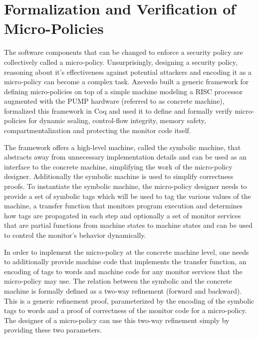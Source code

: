 \section{Formalization and Verification of Micro-Policies}\label{sec:micropolicies}

The software components that can be changed to enforce a security policy
are collectively called a micro-policy.
Unsurprisingly, designing a security policy, reasoning about it's effectiveness 
against potential attackers and encoding it as a micro-policy can become a 
complex task. Azevedo \ETAL \cite{pump_popl2015} built a generic framework for
defining micro-policies on top of a simple machine modeling a RISC processor 
augmented with the PUMP hardware (referred to as concrete machine), formalized
this framework in Coq and used it to define and formally verify micro-policies
for dynamic sealing, control-flow integrity, memory safety, compartmentalization
and protecting the monitor code itself.

The framework offers a high-level machine, called the symbolic machine, that
abstracts away from unnecessary implementation details and can be used as an 
interface to the concrete machine, simplifying the work of the micro-policy 
designer. Additionally the symbolic machine is used to simplify correctness 
proofs. To instantiate the symbolic machine, the micro-policy designer needs to
provide a set of symbolic tags which will be used to tag the various values of
the machine, a transfer function that monitors program execution and determines
how tags are propagated in each step and optionally a set of monitor services 
that are partial functions from machine states to machine states and can be used
to control the monitor's behavior dynamically.

In order to implement the micro-policy at the concrete machine level, one needs
to additionally provide machine code that implements the transfer function, an
encoding of tags to words and machine code for any monitor services that the
micro-policy may use. The relation between the symbolic and the concrete machine
is formally defined as a two-way refinement (forward and backward). This is a 
generic refinement proof, parameterized by the encoding of the symbolic tags to
words and a proof of correctness of the monitor code for a micro-policy.
The designer of a micro-policy can use this two-way refinement simply by
providing these two parameters.

